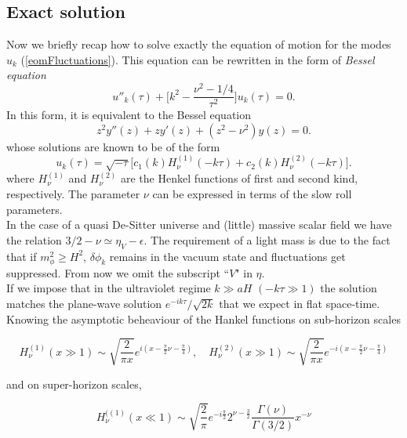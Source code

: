 \documentclass[11pt,a4paper,twoside]{book}
\begin{document}
\subsection{Exact solution}
Now we briefly recap how to solve exactly the equation of motion for the modes $ u_{k} $ (\ref{eomFluctuations}). This equation can be rewritten in the form of \textit{Bessel equation} 
\begin{equation}
	\label{bessel}
	u''_{k}(\tau) + \Big[k^{2} - \frac{\nu^{2}-1/4}{\tau^{2}}\Big] u_{k}(\tau)=0.
\end{equation}
In this form, it is equivalent to the Bessel equation
\begin{equation}
	z^{2}y''(z) + zy'(z) + (z^{2}-\nu^{2})y(z)=0.
\end{equation}				
whose solutions are known to be of the form 
\begin{equation}
	\label{solutionPerturbations}
	u_{k}(\tau) = \sqrt{-\tau}\big [c_{1}(k)H^{(1)}_{\nu}(-k\tau) + c_{2}(k)H_{\nu}^{(2)}(-k\tau)].
\end{equation}
where $ H^{(1)}_{\nu} $ and $ H^{(2)}_{\nu} $ are the Henkel functions of first and second kind, respectively.
The parameter $ \nu $ can be expressed in terms of the slow roll parameters.\\
In the case of a quasi De-Sitter universe and  (little) massive scalar field we have the relation $ 3/2 - \nu \simeq \eta_{V} - \epsilon$.
 The requirement  of a light mass is due to the fact that if $ m^{2}_{\phi} \ge H^{2}$,  $ \delta \phi_{k} $ remains in the vacuum state and fluctuations get suppressed. From now we omit the subscript \textquotedblleft $V$" in $\eta$.\\
If we impose  that in the ultraviolet regime $ k \gg aH $ $ (-k\tau \gg 1) $ the solution matches the plane-wave solution $ e^{-ik\tau}/\sqrt{2k} $ that we expect in flat space-time. Knowing the asymptotic beheaviour of the Hankel functions on sub-horizon scales

\begin{equation}
\label{Hankel1}
H^{(1)}_{\nu}(x \gg 1) \sim \sqrt{\frac{2}{\pi x}} e^{i(x-\frac{\pi}{2}\nu-\frac{\pi}{4})} ,
\quad
H^{(2)}_{\nu}(x \gg 1) \sim \sqrt{\frac{2}{\pi x}} e^{-i(x-\frac{\pi}{2}\nu-\frac{\pi}{4})}
\end{equation}

and on super-horizon scales,

\begin{equation}
\label{Hankel2}
H^{((1)}_{\nu}(x \ll 1) \sim \sqrt{\frac{2}{\pi}}e^{-i\frac{\pi}{2}}2^{\nu-\frac{3}{2}}\frac{\Gamma(\nu)}{\Gamma(3/2)}x^{-\nu}	
\end{equation}
\end{document}
